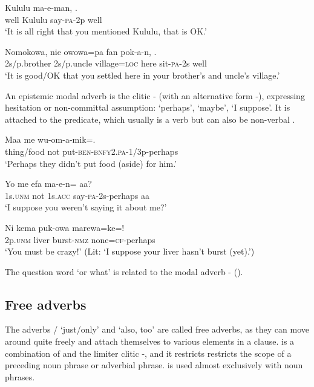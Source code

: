 \ea%
\label{ex:3:x515}
\gll {} Kululu ma-e-man, . \\
well Kululu say-\textsc{pa}-2p well\\
\glt`It is all right that you mentioned Kululu, that is OK.'
\z

\ea%
\label{ex:3:x516}
\gll Nomokowa, nie owowa=pa fan pok-a-n, . \\
2s/p.brother 2s/p.uncle village=\textsc{loc} here sit-\textsc{pa}-2s well\\
\glt`It is good/OK that you settled here in your brother's and uncle's village.'
\z

An epistemic modal adverb is the clitic - (with an alternative form -), expressing hesitation or non-committal assumption: `perhaps', `maybe', `I suppose'. It is attached to the predicate, which usually is a verb but can also be non-verbal .

\ea%
\label{ex:3:x517}
\gll Maa me wu-om-a-mik=. \\
thing/food not put-\textsc{ben}-\textsc{bnfy}2.\textsc{pa}-1/3p-perhaps\\
\glt`Perhaps they didn't put food (aside) for him.'
\z

\ea%
\label{ex:3:x518}
\gll Yo me efa ma-e-n= aa? \\
1s.\textsc{unm} not 1s.\textsc{acc} say-\textsc{pa}-2s-perhaps aa\\
\glt`I suppose you weren't saying it about me?'
\z

\ea%
\label{ex:3:x519}
\gll Ni kema puk-owa marewa=ke=! \\
2p.\textsc{unm} liver burst-\textsc{nmz} none=\textsc{cf}-perhaps\\
\glt`You must be crazy!' (Lit: `I suppose your liver hasn't burst (yet).')
\z

The question word  `or what' is related to the modal adverb - ().

\subsection{Free adverbs}
{}
The adverbs \textstyleStyleVernacularWordsItalic{)}/ `just/only' and  `also, too' are called free adverbs, as they can move around quite freely and attach themselves to various elements in a clause.  is a combination of  and the limiter clitic \nobreakdash-, and it restricts restricts the scope of a preceding noun phrase or adverbial phrase.  is used almost exclusively with noun phrases.

